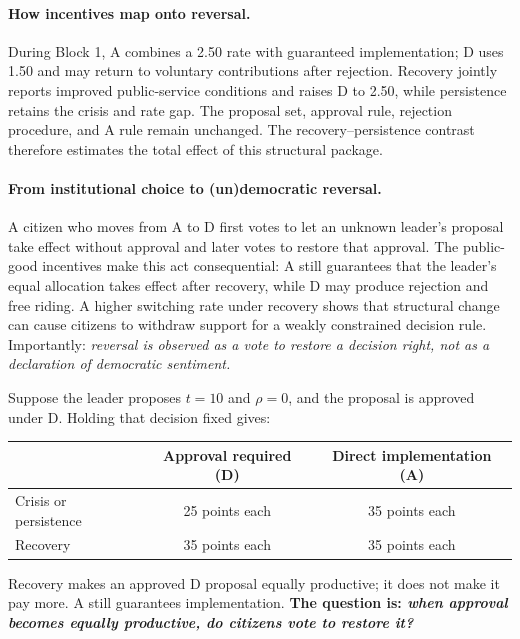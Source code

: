 \documentclass[11pt,a4paper]{article}
\newcommand{\Dproc}{\textsf{D}}
\newcommand{\Aproc}{\textsf{A}}
\begin{document}
\paragraph{How incentives map onto reversal.} During Block 1, \Aproc{} combines a 2.50 rate with guaranteed implementation; \Dproc{} uses 1.50 and may return to voluntary contributions after rejection. Recovery jointly reports improved public-service conditions and raises \Dproc{} to 2.50, while persistence retains the crisis and rate gap. The proposal set, approval rule, rejection procedure, and \Aproc{} rule remain unchanged. The recovery--persistence contrast therefore estimates the total effect of this structural package.

\paragraph{From institutional choice to (un)democratic reversal.} A citizen who moves from \Aproc{} to \Dproc{} first votes to let an unknown leader's proposal take effect without approval and later votes to restore that approval. The public-good incentives make this act consequential: \Aproc{} still guarantees that the leader's equal allocation takes effect after recovery, while \Dproc{} may produce rejection and free riding. A higher switching rate under recovery shows that structural change can cause citizens to withdraw support for a weakly constrained decision rule. Importantly: \emph{reversal is observed as a vote to restore a decision right, not as a declaration of democratic sentiment.}

\begin{payoffbox}
Suppose the leader proposes $t=10$ and $\rho=0$, and the proposal is approved under \Dproc{}. Holding that decision fixed gives:

\begin{center}
\renewcommand{\arraystretch}{1.15}
\begin{tabular}{lcc}
\toprule
& Approval required (\Dproc) & Direct implementation (\Aproc) \\
\midrule
Crisis or persistence & 25 points each & 35 points each \\
Recovery & 35 points each & 35 points each \\
\bottomrule
\end{tabular}
\end{center}

Recovery makes an approved \Dproc{} proposal equally productive; it does not make it pay more. \Aproc{} still guarantees implementation. {\bf The question is: \emph{when approval becomes equally productive, do citizens vote to restore it?}}
\end{payoffbox}
\end{document}
